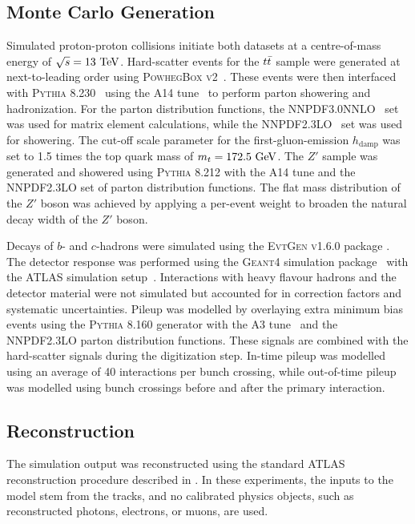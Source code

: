 \subsection{Monte Carlo Generation}

Simulated proton-proton collisions initiate both datasets at a centre-of-mass energy of $\sqrt{s} = 13~\TeV$.
Hard-scatter events for the $t\bar{t}$ sample were generated at next-to-leading order using \textsc{PowhegBox v2}~\cite{Powheg1, Powheg2, Powheg3}.
These events were then interfaced with \textsc{Pythia 8.230}~\cite{Pythia8} using the \textsc{A14} tune~\cite{A14} to perform parton showering and hadronization.
For the parton distribution functions, the \textsc{NNPDF3.0NNLO}~\cite{PDF3.0} set was used for matrix element calculations, while the \textsc{NNPDF2.3LO}~\cite{PDF2.3} set was used for showering.
The cut-off scale parameter for the first-gluon-emission $h_{\text{damp}}$ was set to 1.5 times the top quark mass of $m_t = 172.5~\GeV$.
The $Z'$ sample was generated and showered using \textsc{Pythia 8.212} with the \textsc{A14} tune and the \textsc{NNPDF2.3LO} set of parton distribution functions.
The flat mass distribution of the $Z'$ boson was achieved by applying a per-event weight to broaden the natural decay width of the $Z'$ boson.

Decays of $b$- and $c$-hadrons were simulated using the \textsc{EvtGen v1.6.0} package \cite{EvtGen}.
The detector response was performed using the \textsc{Geant4} simulation package~\cite{Geant4} with the ATLAS simulation setup~\cite{ATLASSim}.
Interactions with heavy flavour hadrons and the detector material were not simulated but accounted for in correction factors and systematic uncertainties.
Pileup was modelled by overlaying extra minimum bias events using the \textsc{Pythia 8.160} generator with the \textsc{A3} tune~\cite{A3} and the \textsc{NNPDF2.3LO} parton distribution functions.
These signals are combined with the hard-scatter signals during the digitization step.
In-time pileup was modelled using an average of 40 interactions per bunch crossing, while out-of-time pileup was modelled using bunch crossings before and after the primary interaction.

\subsection{Reconstruction}

The simulation output was reconstructed using the standard ATLAS reconstruction procedure described in .
In these experiments, the inputs to the model stem from the tracks, and no calibrated physics objects, such as reconstructed photons, electrons, or muons, are used.


